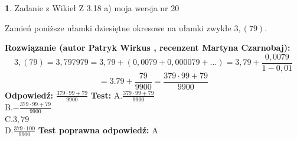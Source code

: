 \documentclass[12pt, a4paper]{article}
\theoremstyle{definition} %
\newtheorem{zad}{}
\newcommand{\zadStart}[1]{\begin{zad}#1\newline}
\newcommand{\zadStop}{\end{zad}}
\newcommand{\rozwStart}[2]{\noindent \textbf{Rozwiązanie (autor #1 , recenzent #2): }\newline}
\newcommand{\rozwStop}{\newline}
\newcommand{\odpStart}{\noindent \textbf{Odpowiedź:}\newline}
\newcommand{\odpStop}{\newline}
\newcommand{\testStart}{\noindent \textbf{Test:}\newline}
\newcommand{\testStop}{\newline}
\newcommand{\kluczStart}{\noindent \textbf{Test poprawna odpowiedź:}\newline}
\newcommand{\kluczStop}{\newline}
\begin{document}
\zadStart{Zadanie z Wikieł Z 3.18 a) moja wersja nr 20}

Zamień poniższe ułamki dziesiętne okresowe na ułamki zwykłe $3,(79)$.
\zadStop
\rozwStart{Patryk Wirkus}{Martyna Czarnobaj}
$$3,(79)=3,797979=3,79+(0,0079+0,000079+...)=3,79+\frac{0,0079}{1-0,01}$$
$$=3.79+\frac{79}{9900}=\frac{379\cdot99+79}{9900}$$
\rozwStop
\odpStart
$\frac{379\cdot99+79}{9900}$
\odpStop
\testStart
A.$\frac{379\cdot99+79}{9900}$\\ B.$-\frac{379\cdot99+79}{9900}$\\ C.$3,79$\\ D.$\frac{379\cdot100}{9900}$
\testStop
\kluczStart
A
\kluczStop
\end{document}
